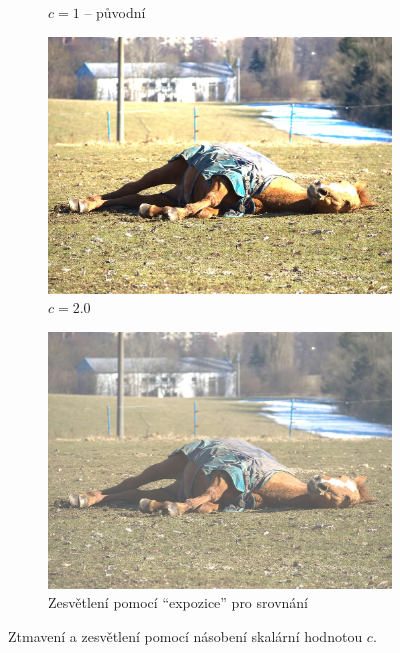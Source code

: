 \documentclass[11pt, a4paper, titlepage]{article}
\renewcommand{\uv}[1]{``#1''}
\begin{document}
\begin{figure}[h]
\begin{subfigure}[t]{0.24\textwidth}
        \caption{$c = 1$ -- původní}
    \end{subfigure}
    \begin{subfigure}[t]{0.24\textwidth}
        \vskip 0pt
        \includegraphics[width=1.0\textwidth]{horse_mul_up.jpg}
        \caption{$c = 2.0$}
    \end{subfigure}
    \begin{subfigure}[t]{0.24\textwidth}
        \vskip 0pt
        \includegraphics[width=1.0\textwidth]{horse_exposure_plus.jpg}
        \caption{Zesvětlení pomocí \uv{expozice} pro srovnání}
    \end{subfigure}
    \caption{Ztmavení a zesvětlení pomocí násobení skalární hodnotou $c$.}
    \label{fig:multiplication}
\end{figure}
\end{document}

